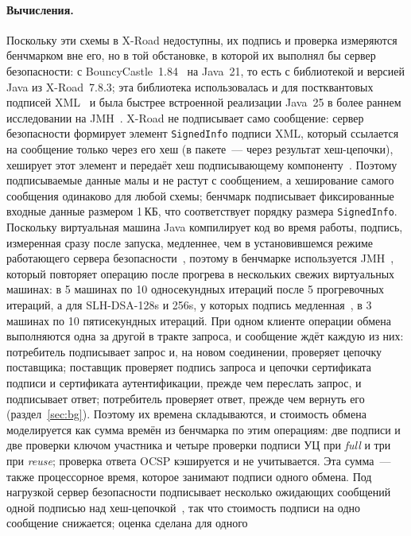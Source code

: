 \documentclass[conference,a4paper]{IEEEtran}
\newcommand{\newtext}[1]{{\color{blue}#1}}
\begin{document}
{\paragraph{Вычисления.} \newtext{Поскольку эти схемы в X-Road недоступны, их подпись и
проверка измеряются бенчмарком вне его, но в той обстановке, в которой их выполнял бы сервер безопасности:
с BouncyCastle~1.84\newtext{~\cite{bouncycastle}} на Java~21, то есть с библиотекой и версией Java из X-Road~7.8.3; эта библиотека использовалась и для постквантовых подписей XML~\cite{mueller2024} и была быстрее
встроенной реализации Java~25 в более раннем исследовании на JMH~\cite{oleksiichuk2026}.
X-Road не подписывает само сообщение: сервер безопасности формирует
элемент \texttt{SignedInfo} подписи XML, который ссылается на сообщение только через его хеш (в
пакете~--- через результат хеш-цепочки), хеширует этот элемент и передаёт хеш подписывающему компоненту\newtext{~\cite{xroadsrc}}. Поэтому подписываемые данные малы и не растут с
сообщением, а хеширование самого сообщения одинаково для любой схемы; бенчмарк подписывает фиксированные
входные данные размером 1\,КБ, что соответствует порядку размера \texttt{SignedInfo}. Поскольку виртуальная машина Java компилирует код во время работы, подпись,
измеренная сразу после запуска, медленнее, чем в установившемся режиме работающего сервера
безопасности~\cite{georges2007}, поэтому в бенчмарке используется JMH\newtext{~\cite{jmh}}, который повторяет операцию после прогрева в
нескольких свежих виртуальных машинах: в 5 машинах по 10 односекундных итераций после 5 прогревочных итераций,
а для SLH-DSA-128s и 256s, у которых подпись медленная~\cite{mueller2024}, в 3 машинах по 10 пятисекундных
итераций. При одном клиенте операции обмена выполняются одна за другой в тракте запроса, и
сообщение ждёт каждую из них: потребитель подписывает запрос и, на новом соединении,
проверяет цепочку поставщика; поставщик проверяет подпись запроса и
цепочки сертификата подписи и сертификата аутентификации, прежде чем переслать запрос, и подписывает
ответ; потребитель проверяет ответ, прежде чем вернуть его (раздел~\ref{sec:bg}). Поэтому их времена
складываются, и стоимость обмена моделируется как сумма времён из бенчмарка по
этим операциям: две подписи и две проверки ключом участника и четыре проверки
подписи УЦ при \emph{full} и три при \emph{reuse}; проверка ответа OCSP
кэшируется и не учитывается. Эта сумма~--- также процессорное время, которое занимают подписи одного обмена.
Под нагрузкой сервер безопасности подписывает несколько ожидающих сообщений одной подписью над
хеш-цепочкой~\cite{xroadarcss}, так что стоимость подписи на одно сообщение снижается; оценка сделана для одного
}}
\end{document}
